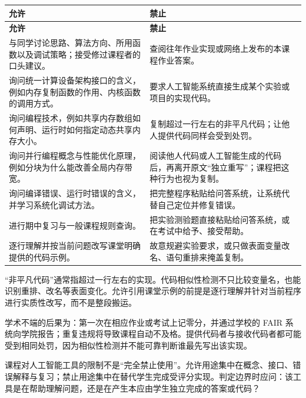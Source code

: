 \begin{longtable}{L{0.47\textwidth}L{0.47\textwidth}}
\toprule
\textbf{允许} & \textbf{禁止} \\
\midrule
\endfirsthead
\toprule
\textbf{允许} & \textbf{禁止} \\
\midrule
\endhead
与同学讨论思路、算法方向、所用函数以及调试策略；接受修过课程者的口头建议。 & 查阅往年作业实现或网络上发布的本课程作业答案。 \\
询问统一计算设备架构接口的含义，例如内存复制函数的作用、内核函数的调用方式。 & 要求人工智能系统直接生成某个实验或项目的实现代码。 \\
询问编程技术，例如共享内存数组如何声明、运行时如何指定动态共享内存大小。 & 复制超过一行左右的非平凡代码；让他人提供代码同样会受到处罚。 \\
询问并行编程概念与性能优化原理，例如分块为什么能改善全局内存带宽。 & 阅读他人代码或人工智能生成的代码后，再离开原文“独立重写”；课程把这种行为也视为复制。 \\
询问编译错误、运行时错误的含义，并学习系统化调试方法。 & 把完整程序粘贴给问答系统，让系统代替自己定位并修复错误。 \\
进行期中复习与一般课程规则查询。 & 把实验测验题直接粘贴给问答系统，或在考试中给予、接受帮助。 \\
逐行理解并按当前问题改写课堂明确提供的代码示例。 & 故意规避实验要求，或只做表面变量改名、语句重排来掩盖复制。 \\
\bottomrule
\end{longtable}

“非平凡代码”通常指超过一行左右的实现。代码相似性检测不只比较变量名，也能识别重排、改名等表面变化。允许引用课堂示例的前提是逐行理解并针对当前程序进行实质性改写，而不是整段搬运。

学术不端的后果为：第一次在相应作业或考试上记零分，并通过学校的 FAIR 系统向学院报告；重复违规将导致课程自动不及格。提供代码者与接收代码者都可能受到相同处罚，因为相似性检测并不能可靠判断谁最先写出该实现。

\begin{warningbox}
课程对人工智能工具的限制不是“完全禁止使用”。允许用途集中在概念、接口、错误解释与复习；禁止用途集中在替代学生完成受评分实现。判定边界时应问：该工具是在帮助理解问题，还是在产生本应由学生独立完成的答案或代码？
\end{warningbox}
